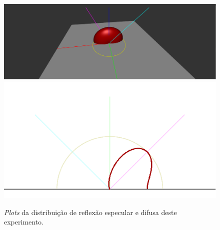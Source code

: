 \begin{figure}[H]
    \caption{\small{\textit{Plots} da distribuição de reflexão especular e difusa deste experimento.}}
    \label{fig-kajiya-plots}
    \vspace{42px}
  \includegraphics[width=\linewidth]{./Imagens/brdfs/aniso-3D-plot}
\endminipage\hfill
{}
  \includegraphics[width=\linewidth]{./Imagens/brdfs/aniso-polar-plot.png}
\endminipage\hfill
\end{figure}

